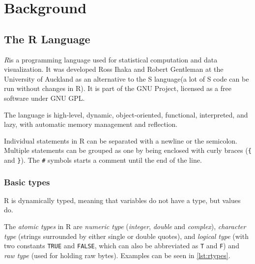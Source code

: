 \chapter{Background}

\begin{chapterabstract}
  \todoadd
\end{chapterabstract}

\section{The R Language}

\textit{R}\todocite is a programming language used for statistical computation and data visualization. It was developed Ross Ihaka and Robert Gentleman at the University of Auckland as an alternative to the S language\todocite (a lot of S code can be run without changes in R). It is part of the GNU Project, licensed as a free software under GNU GPL.

The language is high-level, dynamic, object-oriented, functional, interpreted, and lazy, with automatic memory management and reflection.

Individual statements in R can be separated with a newline or the semicolon. Multiple statements can be grouped as one by being enclosed with curly braces (\texttt{\{} and \texttt{\}}). The \texttt{\#} symbols starts a comment until the end of the line.


\subsection*{Basic types}

R is dynamically typed, meaning that variables do not have a type, but values do.

The \textit{atomic types} in R are \textit{numeric type} (\textit{integer}, \textit{double} and \textit{complex}), \textit{character type} (strings surrounded by either single or double quotes), and \textit{logical type} (with two constants \texttt{TRUE} and \texttt{FALSE}, which can also be abbreviated as \texttt{T} and \texttt{F}) and \textit{raw type} (used for holding raw bytes). Examples can be seen in \ref{lst:rtypes}.

